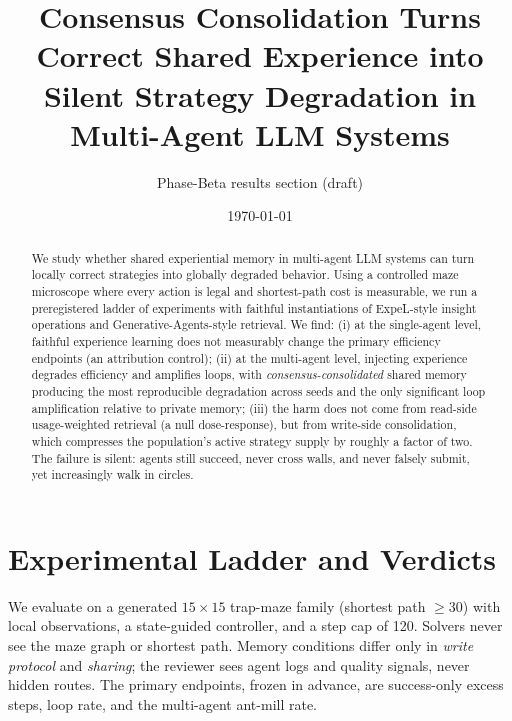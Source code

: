 \documentclass[11pt]{article}
\title{Consensus Consolidation Turns Correct Shared Experience into\\ Silent Strategy Degradation in Multi-Agent LLM Systems}
\author{Phase-Beta results section (draft)}
\date{\today}
\begin{document}
\maketitle

\begin{center}
\end{center}

\begin{abstract}
We study whether shared experiential memory in multi-agent LLM systems can turn locally
correct strategies into globally degraded behavior. Using a controlled maze microscope where
every action is legal and shortest-path cost is measurable, we run a preregistered ladder of
experiments with faithful instantiations of ExpeL-style insight operations and
Generative-Agents-style retrieval. We find: (i) at the single-agent level, faithful experience
learning does not measurably change the primary efficiency endpoints (an attribution control);
(ii) at the multi-agent level, injecting experience degrades efficiency and amplifies loops,
with \emph{consensus-consolidated} shared memory producing the most reproducible degradation
across seeds and the only significant loop amplification relative to private memory;
(iii) the harm does not come from read-side usage-weighted retrieval (a null dose-response),
but from write-side consolidation, which compresses the population's active strategy supply by
roughly a factor of two. The failure is silent: agents still succeed, never cross walls, and
never falsely submit, yet increasingly walk in circles.
\end{abstract}

\section{Experimental Ladder and Verdicts}

We evaluate on a generated $15\times15$ trap-maze family (shortest path $\geq 30$) with local
observations, a state-guided controller, and a step cap of 120. Solvers never see the maze graph
or shortest path. Memory conditions differ only in \emph{write protocol} and \emph{sharing};
the reviewer sees agent logs and quality signals, never hidden routes. The primary endpoints,
frozen in advance, are success-only excess steps, loop rate, and the multi-agent ant-mill rate.
\end{document}
